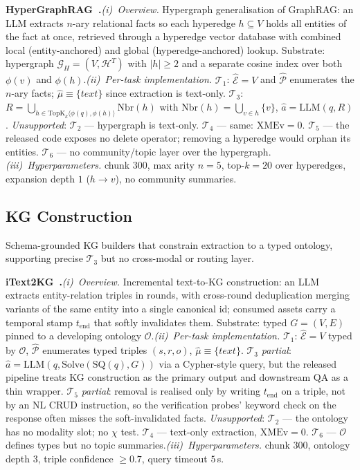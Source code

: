\documentclass{article}
\begin{document}
\noindent\textbf{HyperGraphRAG~\citep{HyperGraphRAG}.}\quad\emph{(i)~Overview.} Hypergraph generalisation of GraphRAG: an LLM extracts $n$-ary relational facts so each hyperedge $h\!\subseteq\!V$ holds all entities of the fact at once, retrieved through a hyperedge vector database with combined local (entity-anchored) and global (hyperedge-anchored) lookup. Substrate: hypergraph $\mathcal{G}_H\!=\!(V,\mathcal{H}^{T})$ with $|h|\!\geq\!2$ and a separate cosine index over both $\phi(v)$ and $\phi(h)$.\quad\emph{(ii)~Per-task implementation.} $\mathcal{T}_1$: $\hat{\mathcal{E}}\!=\!V$ and $\hat{\mathcal{P}}$ enumerates the $n$-ary facts; $\hat{\mu}\!\equiv\!\{\textit{text}\}$ since extraction is text-only. $\mathcal{T}_3$: $R\!=\!\bigcup_{h\in\mathrm{TopK}_{k}\!\langle\phi(q),\phi(h)\rangle}\mathrm{Nbr}(h)$ with $\mathrm{Nbr}(h)\!=\!\bigcup_{v\in h}\{v\}$, $\hat{a}\!=\!\mathrm{LLM}(q,R)$. \emph{Unsupported}: $\mathcal{T}_2$ — hypergraph is text-only. $\mathcal{T}_4$ — same: $\mathrm{XMEv}\!=\!0$. $\mathcal{T}_5$ — the released code exposes no delete operator; removing a hyperedge would orphan its entities. $\mathcal{T}_6$ — no community/topic layer over the hypergraph.\quad\emph{(iii)~Hyperparameters.} chunk $300$, max arity $n\!=\!5$, top-$k\!=\!20$ over hyperedges, expansion depth $1$ ($h\!\to\!v$), no community summaries.

\subsection{KG Construction}\label{app:b-kgconst}

Schema-grounded KG builders that constrain extraction to a typed ontology, supporting precise $\mathcal{T}_3$ but no cross-modal or routing layer.

\noindent\textbf{iText2KG~\citep{iText2KG}.}\quad\emph{(i)~Overview.} Incremental text-to-KG construction: an LLM extracts entity-relation triples in rounds, with cross-round deduplication merging variants of the same entity into a single canonical id; consumed assets carry a temporal stamp $t_{\mathrm{end}}$ that softly invalidates them. Substrate: typed $G\!=\!(V,E)$ pinned to a developing ontology $\mathcal{O}$.\quad\emph{(ii)~Per-task implementation.} $\mathcal{T}_1$: $\hat{\mathcal{E}}\!=\!V$ typed by $\mathcal{O}$, $\hat{\mathcal{P}}$ enumerates typed triples $(s,r,o)$, $\hat{\mu}\!\equiv\!\{\textit{text}\}$. $\mathcal{T}_3$ \emph{partial}: $\hat{a}\!=\!\mathrm{LLM}(q,\mathrm{Solve}(\mathrm{SQ}(q),G))$ via a Cypher-style query, but the released pipeline treats KG construction as the primary output and downstream QA as a thin wrapper. $\mathcal{T}_5$ \emph{partial}: removal is realised only by writing $t_{\mathrm{end}}$ on a triple, not by an NL CRUD instruction, so the verification probes' keyword check on the response often misses the soft-invalidated facts. \emph{Unsupported}: $\mathcal{T}_2$ — the ontology has no modality slot; no $\chi$ test. $\mathcal{T}_4$ — text-only extraction, $\mathrm{XMEv}\!=\!0$. $\mathcal{T}_6$ — $\mathcal{O}$ defines types but no topic summaries.\quad\emph{(iii)~Hyperparameters.} chunk $300$, ontology depth $3$, triple confidence $\geq\!0.7$, query timeout $5$\,s.
\end{document}
